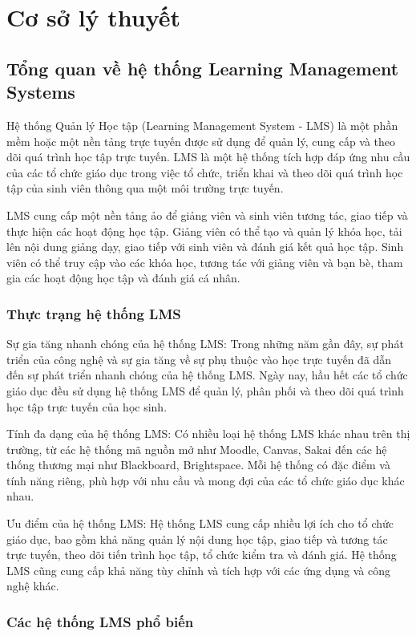 \documentclass[../Thesis.tex]{subfiles}
\begin{document}
\section{Cơ sở lý thuyết}
	\subsection{Tổng quan về hệ thống Learning Management Systems}

	Hệ thống Quản lý Học tập (Learning Management System - LMS) là một phần mềm hoặc một nền tảng trực tuyến được sử dụng để quản lý, cung cấp và theo dõi quá trình học tập trực tuyến. LMS là một hệ thống tích hợp đáp ứng nhu cầu của các tổ chức giáo dục trong việc tổ chức, triển khai và theo dõi quá trình học tập của sinh viên thông qua một môi trường trực tuyến.

	LMS cung cấp một nền tảng ảo để giảng viên và sinh viên tương tác, giao tiếp và thực hiện các hoạt động học tập. Giảng viên có thể tạo và quản lý khóa học, tải lên nội dung giảng dạy, giao tiếp với sinh viên và đánh giá kết quả học tập. Sinh viên có thể truy cập vào các khóa học, tương tác với giảng viên và bạn bè, tham gia các hoạt động học tập và đánh giá cá nhân.

		\subsubsection{Thực trạng hệ thống LMS}
			Sự gia tăng nhanh chóng của hệ thống LMS: Trong những năm gần đây, sự phát triển của công nghệ và sự gia tăng về sự phụ thuộc vào học trực tuyến đã dẫn đến sự phát triển nhanh chóng của hệ thống LMS. Ngày nay, hầu hết các tổ chức giáo dục đều sử dụng hệ thống LMS để quản lý, phân phối và theo dõi quá trình học tập trực tuyến của học sinh.

			Tính đa dạng của hệ thống LMS: Có nhiều loại hệ thống LMS khác nhau trên thị trường, từ các hệ thống mã nguồn mở như Moodle, Canvas, Sakai đến các hệ thống thương mại như Blackboard, Brightspace. Mỗi hệ thống có đặc điểm và tính năng riêng, phù hợp với nhu cầu và mong đợi của các tổ chức giáo dục khác nhau.
			
			Ưu điểm của hệ thống LMS: Hệ thống LMS cung cấp nhiều lợi ích cho tổ chức giáo dục, bao gồm khả năng quản lý nội dung học tập, giao tiếp và tương tác trực tuyến, theo dõi tiến trình học tập, tổ chức kiểm tra và đánh giá. Hệ thống LMS cũng cung cấp khả năng tùy chỉnh và tích hợp với các ứng dụng và công nghệ khác.
			
		\subsubsection{Các hệ thống LMS phổ biến}
\end{document}
